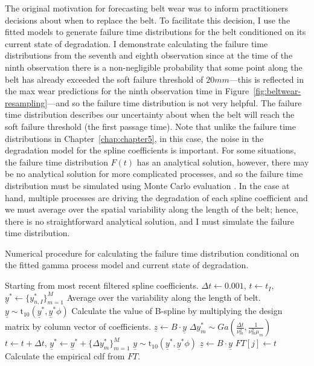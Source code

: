The original motivation for forecasting belt wear was to inform practitioners decisions about when to replace the belt. To facilitate this decision, I use the fitted models to generate failure time distributions for the belt conditioned on its current state of degradation. I demonstrate calculating the failure time distributions from the seventh and eighth observation since at the time of the ninth observation there is a non-negligible probability that some point along the belt has already exceeded the soft failure threshold of $20mm$---this is reflected in the max wear predictions for the ninth observation time in Figure~\ref{fig:beltwear-resampling}---and so the failure time distribution is not very helpful. The failure time distribution describes our uncertainty about when the belt will reach the soft failure threshold (the first passage time). Note that unlike the failure time distributions in Chapter~\ref{chap:chapter5}, in this case, the noise in the degradation model for the spline coefficients is important. For some situations, the failure time distribution $F(t)$ has an analytical solution, however, there may be no analytical solution for more complicated processes, and so the failure time distribution must be simulated using Monte Carlo evaluation \citep[p.~504-506]{Meeker2022}. In the case at hand, multiple processes are driving the degradation of each spline coefficient and we must average over the spatial variability along the length of the belt; hence, there is no straightforward analytical solution, and I must simulate the failure time distribution.

\begin{algorithm}
	\caption{Numerical procedure for calculating the failure time distribution conditional on the fitted gamma process model and current state of degradation.}
  \label{algo:ftd}
	\begin{algorithmic}[1]
        \State Starting from most recent filtered spline coefficients.
        \State $\Delta t \gets 0.001$, $t \gets t_I$, $\underline{y}^* \gets \{y^*_{n, I}\}^M_{m = 1}$
        \State Average over the variability along the length of belt.
        \State $\underline{y} \sim \mbox{t}_{10}\left(\underline{y}^*, \underline{y}^* \phi\right)$
        \State Calculate the value of B-spline by multiplying the design matrix by column vector of coefficients.
        \State $\underline{z} \gets B \cdot \underline{y}$
          \State $\Delta y^*_m \sim Ga\left(\frac{\Delta t}{\nu_m^2}, \frac{1}{\nu_m^2 \mu_m}\right)$
          \State $t \gets t + \Delta t$, $\underline{y}^* \gets \underline{y}^* + \{\Delta y^*_m\}^M_{m = 1}$
          \State $\underline{y} \sim \mbox{t}_{10}\left(\underline{y}^*, \underline{y}^* \phi\right)$
          \State $\underline{z} \gets B \cdot \underline{y}$
        \EndWhile
        \State $FT[j] \gets t$
      \EndFor
      \State Calculate the empirical cdf from $FT$.
    \EndFor
	\end{algorithmic} 
\end{algorithm} 

